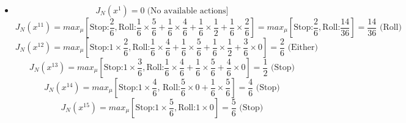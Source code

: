 \documentclass[11pt]{article}
\newenvironment{problem}[2][Problem]{\begin{trivlist}
\item[\hskip \labelsep {\bfseries #1}\hskip \labelsep {\bfseries #2.}]}{\end{trivlist}}
\begin{document}
\begin{problem}{4}
\begin{itemize}
		\item[Roll 3]	
		\begin{equation}
			J_N(x^1) = 0 \; \text{(No available actions]}
		\end{equation}
		\begin{equation}
			J_N(x^{11}) = max_{\mu} \left[ \text{Stop:} \frac{2}{6}, \text{Roll:} \frac{1}{6} \times \frac{5}{6} + \frac{1}{6} \times \frac{4}{6} + \frac{1}{6} \times \frac{1}{2} + \frac{1}{6} \times \frac{2}{6}\right] = max_{\mu} \left[ \text{Stop:} \frac{2}{6}, \text{Roll:} \frac{14}{36}\right] = \frac{14}{36} \text{ (Roll)}
		\end{equation}
		\begin{equation}
			J_N(x^{12}) = max_{\mu} \left[ \text{Stop:} 1 \times \frac{2}{6}, \text{Roll:} \frac{1}{6} \times \frac{4}{6} + \frac{1}{6} \times \frac{5}{6} + \frac{1}{6} \times \frac{1}{2} + \frac{3}{6} \times 0 \right] = \frac{2}{6} \text{ (Either)}
		\end{equation}
		\begin{equation}
			J_N(x^{13}) = max_{\mu} \left[ \text{Stop:} 1 \times \frac{3}{6}, \text{Roll:} \frac{1}{6} \times \frac{4}{6} + \frac{1}{6} \times \frac{5}{6} + \frac{4}{6} \times 0 \right] = \frac{1}{2} \text{ (Stop)}
		\end{equation}
		\begin{equation}
			J_N(x^{14}) = max_{\mu} \left[ \text{Stop:} 1 \times \frac{4}{6} \text{, Roll:} \frac{5}{6} \times 0 + \frac{1}{6} \times \frac{5}{6}\right] = \frac{4}{6} \text{ (Stop)}
		\end{equation}
		\begin{equation}
			J_N(x^{15}) = max_{\mu} \left[ \text{Stop:} 1 \times \frac{5}{6}, \text{Roll:} 1 \times 0 \right] = \frac{5}{6} \text{ (Stop)}
		\end{equation}
		
		
		
		
		

\end{itemize}
\end{problem}
\end{document}
